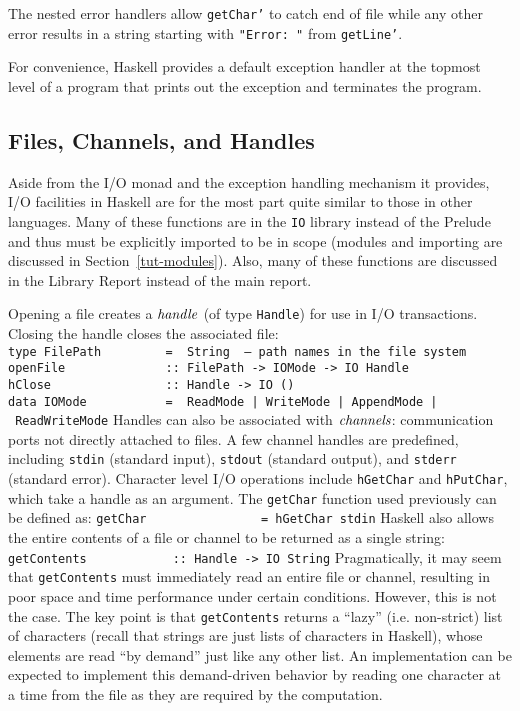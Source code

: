 The nested error handlers allow \mbox{\tt getChar'} to catch end of file
while any other error results in a string starting with \mbox{\tt "Error:\ "}
from \mbox{\tt getLine'}.

For convenience, Haskell provides a default exception handler at the
topmost level of a program that prints out the
exception and terminates the program.

\subsection{Files, Channels, and Handles}

Aside from the I/O monad and the exception handling mechanism it
provides, I/O facilities in Haskell are for the most part quite
similar to those in other languages.  Many of these functions are in
the \mbox{\tt IO} library instead of the Prelude and thus must be explicitly
imported to be in scope (modules and importing are discussed in
Section~\ref{tut-modules}).  Also, many of these functions are
discussed in the Library Report instead of the main report.

Opening a file creates a \mbox{$\it handle$} (of type \mbox{\tt Handle}) for use in I/O
transactions.  Closing the handle closes the associated file:
\bprog
\mbox{\tt type\ FilePath\ \ \ \ \ \ \ \ \ =\ \ String\ \ --\ path\ names\ in\ the\ file\ system}\\
\mbox{\tt openFile\ \ \ \ \ \ \ \ \ \ \ \ \ \ ::\ FilePath\ ->\ IOMode\ ->\ IO\ Handle}\\
\mbox{\tt hClose\ \ \ \ \ \ \ \ \ \ \ \ \ \ \ \ ::\ Handle\ ->\ IO\ ()\ }\\
\mbox{\tt data\ IOMode\ \ \ \ \ \ \ \ \ \ \ =\ \ ReadMode\ |\ WriteMode\ |\ AppendMode\ |\ ReadWriteMode}
\eprog
Handles can also be associated with \mbox{$\it channels$}: communication ports
not directly attached to files.  A few channel handles are predefined,
including \mbox{\tt stdin} (standard input), \mbox{\tt stdout} (standard output), and
\mbox{\tt stderr} (standard error).  Character level I/O operations include
\mbox{\tt hGetChar} and \mbox{\tt hPutChar}, which take a handle as an argument.  The
\mbox{\tt getChar} function used previously can be defined as:
\bprog
\mbox{\tt getChar\ \ \ \ \ \ \ \ \ \ \ \ \ \ \ \ =\ hGetChar\ stdin}
\eprog
Haskell also allows the entire contents of a file or channel to be
returned as a single string:
\bprog
\mbox{\tt getContents\ \ \ \ \ \ \ \ \ \ \ \ ::\ Handle\ ->\ IO\ String}
\eprog
Pragmatically, it may seem that \mbox{\tt getContents} must immediately read an
entire file or channel, resulting in poor space and time performance
under certain conditions.  However, this is not the case.  The key
point is that \mbox{\tt getContents} returns a ``lazy'' (i.e. non-strict) list
of characters (recall that strings are just lists of characters in
Haskell), whose elements are read ``by demand'' just like any other
list.  An implementation can be expected to implement this
demand-driven behavior by reading one character at a time from the
file as they are required by the computation.

